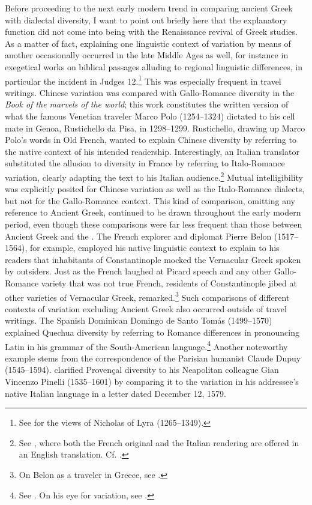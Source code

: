Before proceeding to the next early modern trend in comparing ancient Greek with  dialectal diversity, I want to point out briefly here that the explanatory function did not come into being with the Renaissance revival of Greek studies. As a matter of fact, explaining one linguistic context of variation by means of another occasionally occurred in the late Middle Ages as well, for instance in exegetical works on biblical passages alluding to regional linguistic differences, in particular the  incident in Judges 12.\footnote{See \citet[199--200]{VanRooy2018b} for the views of Nicholas of Lyra (1265–1349).} This was especially frequent in travel writings. Chinese variation was compared with Gallo-Romance diversity in the \textit{Book of the marvels of the world}; this work constitutes the written version of what the famous Venetian traveler Marco Polo (1254–1324) dictated to his cell mate in Genoa, Rustichello da Pisa, in 1298–1299. Rustichello, drawing up Marco Polo’s words in Old French, wanted to explain Chinese diversity by referring to the native context of his intended readership. Interestingly, an Italian translator substituted the allusion to diversity in France by referring to Italo-Romance variation, clearly adapting the text to his Italian audience.\footnote{See \citet[157]{Polo1938}, where both the French original and the Italian rendering are offered in an English translation. Cf. \citet[855]{Borst1959}.} Mutual intelligibility was explicitly posited for Chinese variation as well as the Italo-Romance dialects, but not for the Gallo-Romance context. This kind of comparison, omitting any reference to Ancient Greek, continued to be drawn throughout the early modern period, even though these comparisons were far less frequent than those between Ancient Greek and the . The French explorer and diplomat Pierre Belon (1517–1564), for example, employed his native linguistic context to explain to his readers that inhabitants of Constantinople mocked the Vernacular Greek spoken by outsiders. Just as the French laughed at Picard speech and any other Gallo-Romance variety that was not true French, residents of Constantinople jibed at other varieties of Vernacular Greek, \citet[5\textsc{\textsuperscript{v}}]{Belon1553} remarked.\footnote{On Belon as a traveler in Greece, see \citet[esp. 122]{Vingopoulou2004}.} Such comparisons of different contexts of variation excluding Ancient Greek also occurred outside of travel writings. The Spanish Dominican Domingo de Santo Tomás (1499–1570) explained Quechua diversity by referring to Romance differences in pronouncing Latin in his grammar of the South-American language.\footnote{See \citet[1\textsc{\textsuperscript{v}}]{Santo1560}. On his eye for variation, see \citet[140]{Calvo2005}.} Another noteworthy example stems from the correspondence of the Parisian humanist Claude Dupuy (1545–1594). \citet[274]{Dupuy2001} clarified Provençal diversity to his Neapolitan colleague Gian Vincenzo Pinelli (1535–1601) by comparing it to the variation in his addressee’s native Italian language in a letter dated December 12, 1579.

